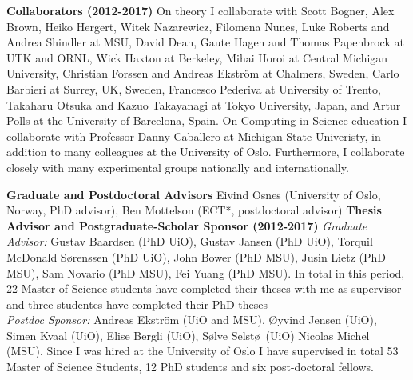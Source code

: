 \noindent
{\bf Collaborators (2012-2017)}
On theory I collaborate
with Scott Bogner, Alex Brown, Heiko Hergert, Witek Nazarewicz, Filomena Nunes, Luke Roberts and Andrea Shindler at MSU, 
David Dean, Gaute Hagen and Thomas Papenbrock at UTK
and ORNL, Wick Haxton at Berkeley, Mihai Horoi at Central Michigan University,
Christian Forssen and Andreas Ekstr\"om at Chalmers, Sweden, Carlo Barbieri at Surrey, UK, 
Sweden, Francesco Pederiva at University of Trento, Takaharu Otsuka and Kazuo Takayanagi at Tokyo University, Japan, 
and Artur Polls at the University of Barcelona, Spain.  On Computing in Science education I collaborate with Professor Danny Caballero at Michigan State Univeristy, in addition to many colleagues at the University of Oslo.
Furthermore, I collaborate closely with many experimental groups nationally and internationally.

\medskip

\noindent
{\bf Graduate and Postdoctoral Advisors}
Eivind Osnes (University of Oslo, Norway, PhD advisor), Ben Mottelson (ECT*, postdoctoral advisor)
\medskip
\noindent
{\bf Thesis Advisor and Postgraduate-Scholar Sponsor (2012-2017)}
\noindent
{\it Graduate Advisor:} Gustav Baardsen (PhD UiO), Gustav Jansen (PhD UiO), Torquil McDonald S\o renssen (PhD UiO),
John Bower (PhD MSU), Jusin Lietz (PhD MSU), Sam Novario (PhD MSU), Fei Yuang (PhD MSU). In total in this period,
22 Master of Science students have completed their theses with me as supervisor and three studentes have completed their  PhD theses \\ {\it Postdoc
Sponsor:} Andreas Ekstr\"om (UiO and MSU), \O yvind Jensen (UiO),
Simen Kvaal (UiO), Elise Bergli (UiO), S\o lve Selst\o\ (UiO) Nicolas
Michel (MSU). Since I was hired at the University of Oslo I have supervised in total 53 Master of Science Students, 12 PhD students and six post-doctoral fellows.






